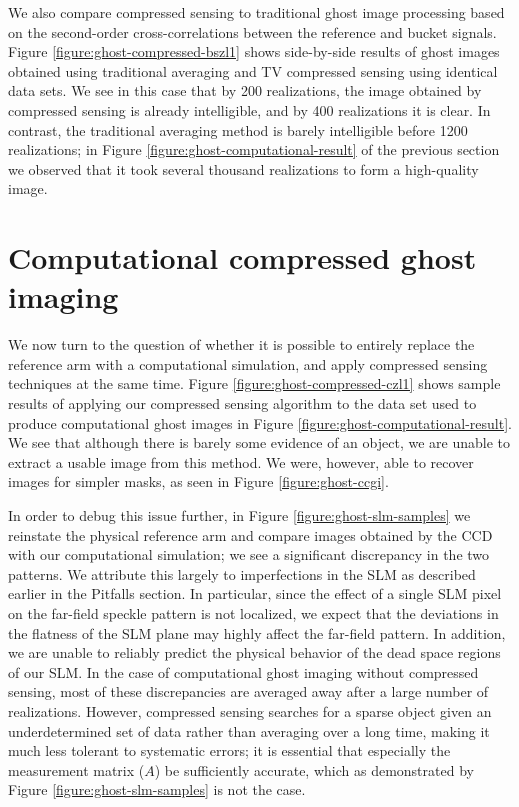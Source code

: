 We also compare compressed sensing to traditional ghost image processing based on the second-order cross-correlations between the reference and bucket signals. Figure \ref{figure:ghost-compressed-bszl1} shows side-by-side results of ghost images obtained using traditional averaging and TV compressed sensing using identical data sets. We see in this case that by 200 realizations, the image obtained by compressed sensing is already intelligible, and by 400 realizations it is clear. In contrast, the traditional averaging method is barely intelligible before 1200 realizations; in Figure \ref{figure:ghost-computational-result} of the previous section we observed that it took several thousand realizations to form a high-quality image.

\section{Computational compressed ghost imaging}

We now turn to the question of whether it is possible to entirely replace the reference arm with a computational simulation, and apply compressed sensing techniques at the same time. Figure \ref{figure:ghost-compressed-czl1} shows sample results of applying our compressed sensing algorithm to the data set used to produce computational ghost images in Figure \ref{figure:ghost-computational-result}. We see that although there is barely some evidence of an object, we are unable to extract a usable image from this method. We were, however, able to recover images for simpler masks, as seen in Figure \ref{figure:ghost-ccgi}.

In order to debug this issue further, in Figure \ref{figure:ghost-slm-samples} we reinstate the physical reference arm and compare images obtained by the CCD with our computational simulation; we see a significant discrepancy in the two patterns. We attribute this largely to imperfections in the SLM as described earlier in the Pitfalls section. In particular, since the effect of a single SLM pixel on the far-field speckle pattern is not localized, we expect that the deviations in the flatness of the SLM plane may highly affect the far-field pattern. In addition, we are unable to reliably predict the physical behavior of the dead space regions of our SLM. In the case of computational ghost imaging without compressed sensing, most of these discrepancies are averaged away after a large number of realizations. However, compressed sensing searches for a sparse object given an underdetermined set of data rather than averaging over a long time, making it much less tolerant to systematic errors; it is essential that especially the measurement matrix ($A$) be sufficiently accurate, which as demonstrated by Figure \ref{figure:ghost-slm-samples} is not the case.

